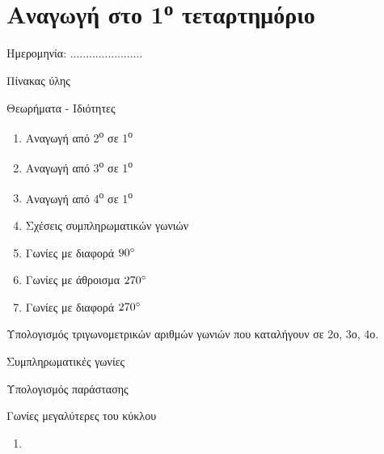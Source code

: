 \documentclass[twoside,nofonts,internet,math,spyros]{frontisthrio}
\newcommand{\tss}[1]{\textsuperscript{#1}}
\newcommand{\myitem}{\stepcounter{enumi}\item[\raisebox{0.5mm}{\faExclamationTriangle}\ \Large$\square$]}
\begin{document}
\section{Αναγωγή στο 1\tss{ο} τεταρτημόριο}
\begin{flushright}
\faCalendar* Ημερομηνία: .......................
\end{flushright}
\begin{mybox}[mysubtitle]{Πίνακας ύλης}
\begin{tcbraster}[raster columns=1,raster equal height]
\begin{myleftbox}{Θεωρήματα - Ιδιότητες\ \ \faTools}
\begin{multicols}{2}
\begin{enumerate}[itemsep=0mm]
\item Αναγωγή από 2\tss{ο} σε 1\tss{ο}
\item Αναγωγή από 3\tss{ο} σε 1\tss{ο}
\item Αναγωγή από 4\tss{ο} σε 1\tss{ο}
\item Σχέσεις συμπληρωματικών γωνιών
\item Γωνίες με διαφορά $ 90\degree $
\item Γωνίες με άθροισμα $ 270\degree $
\item Γωνίες με διαφορά $ 270\degree $
\end{enumerate}
\end{multicols}
\end{myleftbox}
\end{tcbraster}
\begin{multicols}{2}
\begin{todolist}[itemsep=0mm]
\myitem Υπολογισμός τριγωνομετρικών αριθμών γωνιών που καταλήγουν σε 2ο, 3ο, 4ο.
\item Συμπληρωματικές γωνίες
\item Υπολογισμός παράστασης
\item Γωνίες μεγαλύτερες του κύκλου
\end{todolist}
\end{multicols}
\begin{multicols}{2}
\begin{enumerate}[itemsep=0mm]
\item 
\end{enumerate}
\end{multicols}
\end{mybox}
\newpage
\end{document}
